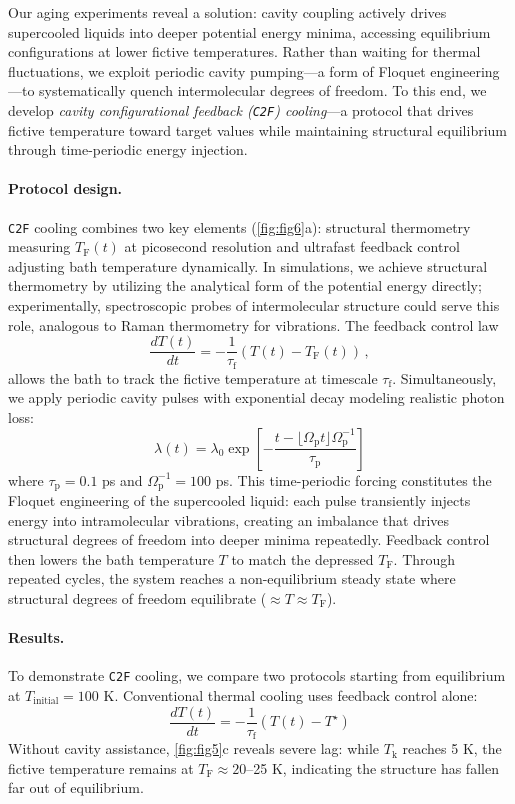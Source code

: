 \documentclass[%
 reprint,
 amsmath,amssymb,
 aps,
]{revtex4-2}
\begin{document}
Our aging experiments reveal a solution: cavity coupling actively drives supercooled liquids into deeper potential energy minima, accessing equilibrium configurations at lower fictive temperatures. Rather than waiting for thermal fluctuations, we exploit periodic cavity pumping—a form of Floquet engineering—to systematically quench intermolecular degrees of freedom. 
To this end, we develop \textit{cavity configurational feedback (\texttt{C2F}) cooling}---a protocol that drives fictive temperature toward target values while maintaining structural equilibrium through time-periodic energy injection.

\paragraph*{Protocol design.} 
\texttt{C2F} cooling combines two key elements (\cref{fig:fig6}a): structural thermometry measuring $T_\mathrm{F}(t)$ at picosecond resolution and ultrafast feedback control adjusting bath temperature dynamically. 
In simulations, we achieve structural thermometry by utilizing the analytical form of the potential energy directly; experimentally, spectroscopic probes of intermolecular structure could serve this role, analogous to Raman thermometry for vibrations. The feedback control law
\begin{equation}
\frac{dT(t)}{dt} = -\frac{1}{\tau_\mathrm{f}}\left(T(t)-T_\mathrm{F}(t) \right) \,,
\end{equation}
allows the bath to track the fictive temperature at timescale $\tau_\mathrm{f}$. Simultaneously, we apply periodic cavity pulses with exponential decay modeling realistic photon loss:
\begin{equation}
\lambda(t) = \lambda_0 \exp \left[-\frac{t- \lfloor \Omega_\mathrm{p} t\rfloor \Omega^{-1}_\mathrm{p}}{\tau_\mathrm{p}}\right]
\end{equation}
where $\tau_\mathrm{p} = 0.1$ ps and $\Omega_\mathrm{p}^{-1} = 100$ ps. This time-periodic forcing constitutes the Floquet engineering of the supercooled liquid: each pulse transiently injects energy into intramolecular vibrations, creating an imbalance that drives structural degrees of freedom into deeper minima repeatedly. Feedback control then lowers the bath temperature $T$ to match the depressed $T_\mathrm{F}$. Through repeated cycles, the system reaches a non-equilibrium steady state where structural degrees of freedom equilibrate ($\approx T \approx T_\mathrm{F}$).

\paragraph*{Results.} To demonstrate \texttt{C2F} cooling, we compare two protocols starting from equilibrium at $T_\mathrm{initial} = 100$ K. Conventional thermal cooling uses feedback control alone:
\begin{equation}
\frac{dT(t)}{dt} = -\frac{1}{\tau_\mathrm{f}} \left(T(t)-T^\star\right)
\end{equation}
Without cavity assistance, \cref{fig:fig5}c reveals severe lag: while $T_\mathrm{k}$ reaches 5 K, the fictive temperature remains at $T_\mathrm{F} \approx 20$--25 K, indicating the structure has fallen far out of equilibrium.
\end{document}
